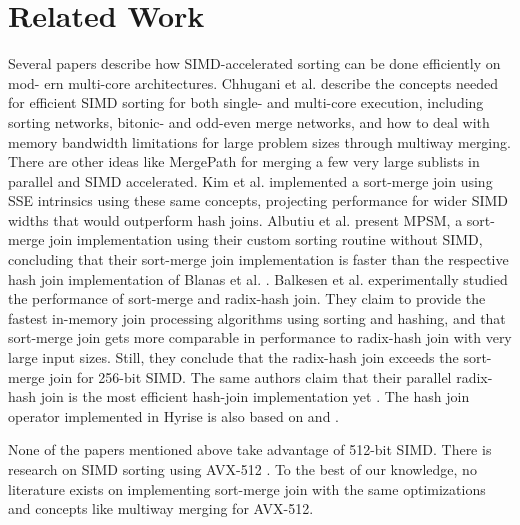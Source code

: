\section{Related Work}
\label{sec:related-work}

Several papers describe how SIMD-accelerated sorting can be done efficiently on mod-
ern multi-core architectures.
Chhugani et al. \cite{10.14778/1454159.1454171} describe the concepts 
needed for efficient SIMD sorting for both single- and multi-core execution, including sorting
networks, bitonic- and odd-even merge networks, and how to deal with memory bandwidth limitations 
for large problem sizes through multiway merging. There are other ideas like MergePath \cite{MergePath}
for merging a few very large sublists in parallel and SIMD accelerated.
Kim et al. \cite{10.14778/1687553.1687564} implemented a sort-merge join using SSE intrinsics using these same 
concepts, projecting performance for wider SIMD widths that would outperform hash joins. Albutiu 
et al. \cite{MPSM} present MPSM, a sort-merge join implementation using their custom sorting routine
without SIMD, concluding that their sort-merge join
implementation is faster than the respective hash join implementation of Blanas et al. \cite{10.1145/1989323.1989328}. 
Balkesen et al. \cite{Balkesen} experimentally studied the performance of sort-merge and radix-hash join.
They claim to provide the fastest in-memory join processing algorithms using sorting and hashing,
and that sort-merge join gets more comparable in performance to radix-hash join with very large 
input sizes. Still, they conclude that the radix-hash join exceeds the sort-merge join for 256-bit
SIMD. The same authors claim that their parallel radix-hash join is the most efficient hash-join
implementation yet \cite{6544839}. The hash join operator
implemented in Hyrise is also based on \cite{6544839} and \cite{Balkesen}. 

None of the papers mentioned above take advantage of 512-bit SIMD. 
There is research on SIMD sorting using AVX-512 \cite{Watkins, 8855628}. To the best of our knowledge,
no literature exists on implementing sort-merge join with the same optimizations and concepts like
multiway merging for AVX-512. 

